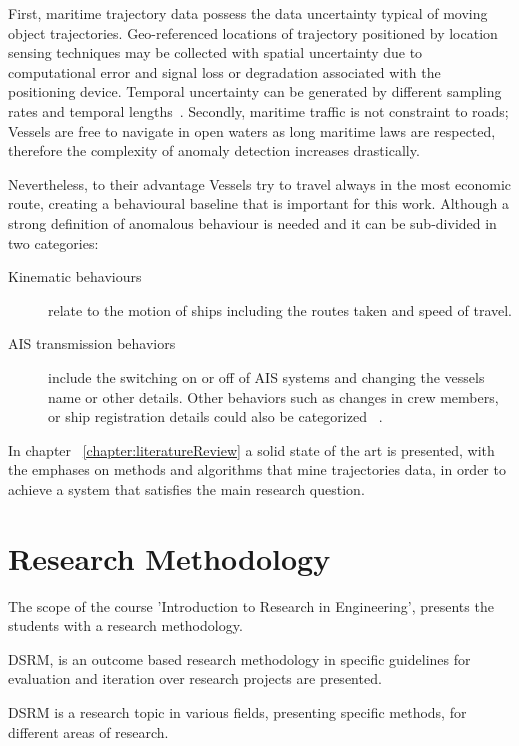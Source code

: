 First, maritime trajectory data possess the data uncertainty typical of moving object trajectories.
Geo-referenced locations of trajectory positioned by location sensing techniques may be collected with spatial uncertainty due to computational error and signal loss or degradation associated with the positioning device. Temporal uncertainty can be generated by different sampling rates and temporal lengths~\cite{Lee}. 
Secondly, maritime traffic is not constraint to roads; Vessels are free to navigate in open waters 
as long maritime laws are respected, therefore the complexity of anomaly detection increases drastically.

Nevertheless, to their advantage Vessels try to travel always in the most economic route, creating a behavioural baseline that is important for this work. Although a strong definition of anomalous behaviour is needed and it can be sub-divided in two categories:

\begin{description}
\item[Kinematic behaviours] relate to the motion of ships including the routes taken and speed of travel.
\item [AIS transmission behaviors] include the switching on or off of AIS systems and changing the vessels name or other details. Other behaviors such as changes in crew members, or ship registration details could also be categorized ~\cite{Lane2010}.
\end{description}

In chapter ~\ref{chapter:literatureReview} a solid state of the art is presented, with the emphases on methods and algorithms that mine trajectories data, in order to achieve a system that satisfies the main research question.


\section{Research Methodology}
The scope of the course 'Introduction to Research in Engineering', presents the students with a research methodology.

DSRM, is an outcome based research methodology in specific guidelines for evaluation and iteration over research projects are presented.

DSRM is a research topic in various fields, presenting specific methods, for different areas of research. 


